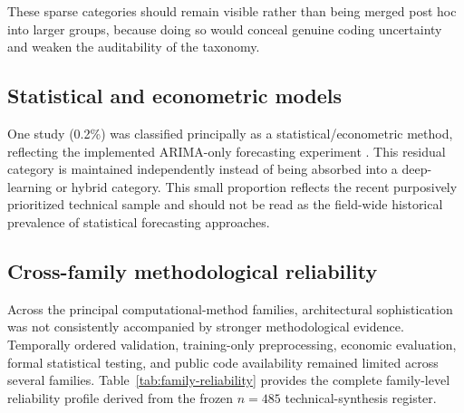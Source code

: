 \documentclass[12pt]{article}
\numberwithin{equation}{section}
\begin{document}
These sparse categories should remain visible rather than being merged
post hoc into larger groups, because doing so would conceal genuine
coding uncertainty and weaken the auditability of the taxonomy.

\subsection{Statistical and econometric models}
One study (0.2\%) was classified principally as a statistical/econometric
method, reflecting the implemented ARIMA-only forecasting experiment \cite{P00211}.
This residual category is maintained independently instead of being
absorbed into a deep-learning or hybrid category. This small proportion
reflects the recent purposively prioritized technical sample and should
not be read as the field-wide historical prevalence of statistical
forecasting approaches.

\subsection{Cross-family methodological reliability}

Across the principal computational-method families, architectural
sophistication was not consistently accompanied by stronger methodological
evidence. Temporally ordered validation, training-only preprocessing,
economic evaluation, formal statistical testing, and public code availability
remained limited across several families. Table~\ref{tab:family-reliability}
provides the complete family-level reliability profile derived from the frozen
\(n=485\) technical-synthesis register.

\end{document}
